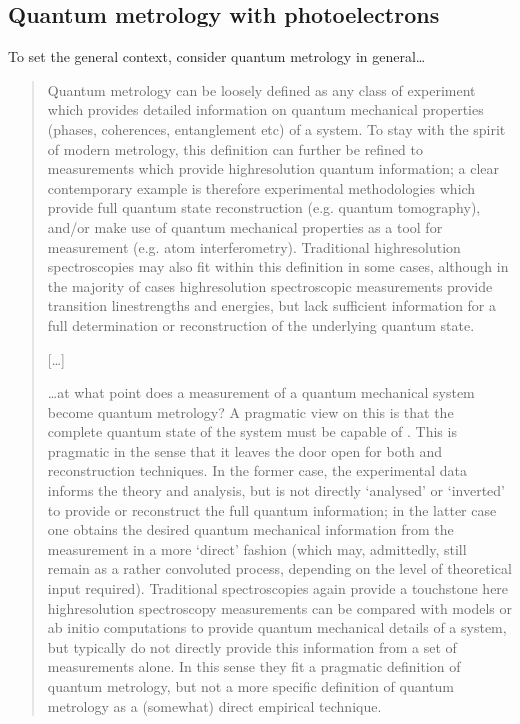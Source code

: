 \documentclass[letterpaper,table,10pt,english]{jupyterBook}
\begin{document}
\subsection{Quantum metrology with photoelectrons}
\label{\detokenize{part1/main_intro_051122:quantum-metrology-with-photoelectrons}}
\sphinxAtStartPar
To set the general context, consider quantum metrology in general…
\begin{quote}

\sphinxAtStartPar
Quantum metrology can be loosely defined as any class of experiment which provides detailed information on quantum mechanical properties (phases, coherences, entanglement etc) of a system. To stay with the spirit of modern metrology, this definition can further be refined to measurements which provide high\sphinxhyphen{}resolution quantum information; a clear contemporary example is therefore experimental methodologies which provide full quantum state reconstruction (e.g. quantum tomography), and/or make use of quantum mechanical properties as a tool for measurement (e.g. atom interferometry). Traditional high\sphinxhyphen{}resolution spectroscopies may also fit within this definition in some cases, although in the majority of cases high\sphinxhyphen{}resolution spectroscopic measurements provide transition line\sphinxhyphen{}strengths and energies, but lack sufficient information for a full determination or reconstruction of the underlying quantum state.

\sphinxAtStartPar
{[}…{]}

\sphinxAtStartPar
…at what point does a measurement of a quantum mechanical system become quantum metrology? A pragmatic view on this is that the complete quantum state of the system must be capable of . This is pragmatic in the sense that it leaves the door open for both  and  reconstruction techniques. In the former case, the experimental data informs the theory and analysis, but is not directly ‘analysed’ or ‘inverted’ to provide or reconstruct the full quantum information; in the latter case one obtains the desired quantum mechanical information from the measurement in a more ‘direct’ fashion (which may, admittedly, still remain as a rather convoluted process, depending on the level of theoretical input required). Traditional spectroscopies again provide a touchstone here \sphinxhyphen{} high\sphinxhyphen{}resolution spectroscopy measurements can be compared with models or ab initio computations to provide quantum mechanical details of a system, but typically do not directly provide this information from a set of measurements alone. In this sense they fit a pragmatic definition of quantum metrology, but not a more specific definition of quantum metrology as a (somewhat) direct empirical technique.


\end{quote}
\end{document}
